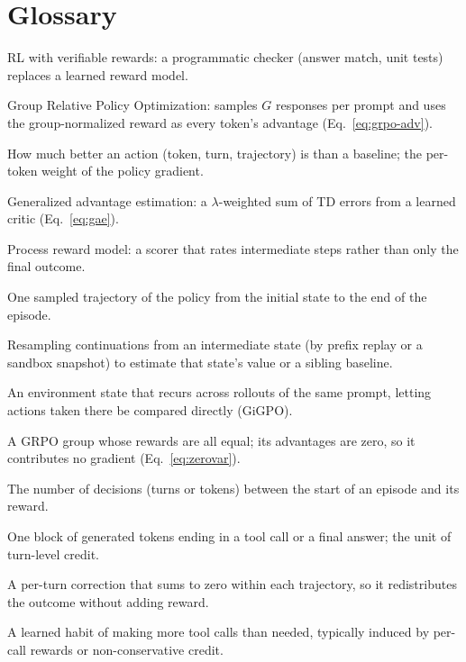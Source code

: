 \section{Glossary}\label{app:glossary}

\begin{description}[leftmargin=0pt,itemsep=1pt,font=\normalfont\bfseries]
  \item[RLVR.] RL with verifiable rewards: a programmatic checker (answer match, unit tests) replaces a learned reward model.
  \item[GRPO.] Group Relative Policy Optimization: samples $G$ responses per prompt and uses the group-normalized reward as every token's advantage (Eq.~\ref{eq:grpo-adv}).
  \item[Advantage ($A$).] How much better an action (token, turn, trajectory) is than a baseline; the per-token weight of the policy gradient.
  \item[GAE.] Generalized advantage estimation: a $\lambda$-weighted sum of TD errors from a learned critic (Eq.~\ref{eq:gae}).
  \item[PRM.] Process reward model: a scorer that rates intermediate steps rather than only the final outcome.
  \item[Rollout.] One sampled trajectory of the policy from the initial state to the end of the episode.
  \item[Rerollout / branching.] Resampling continuations from an intermediate state (by prefix replay or a sandbox snapshot) to estimate that state's value or a sibling baseline.
  \item[Anchor state.] An environment state that recurs across rollouts of the same prompt, letting actions taken there be compared directly (GiGPO).
  \item[Zero-variance group.] A GRPO group whose rewards are all equal; its advantages are zero, so it contributes no gradient (Eq.~\ref{eq:zerovar}).
  \item[Horizon ($T$).] The number of decisions (turns or tokens) between the start of an episode and its reward.
  \item[Turn.] One block of generated tokens ending in a tool call or a final answer; the unit of turn-level credit.
  \item[Conservative credit.] A per-turn correction that sums to zero within each trajectory, so it redistributes the outcome without adding reward.
  \item[Over-calling.] A learned habit of making more tool calls than needed, typically induced by per-call rewards or non-conservative credit.

\end{description}
